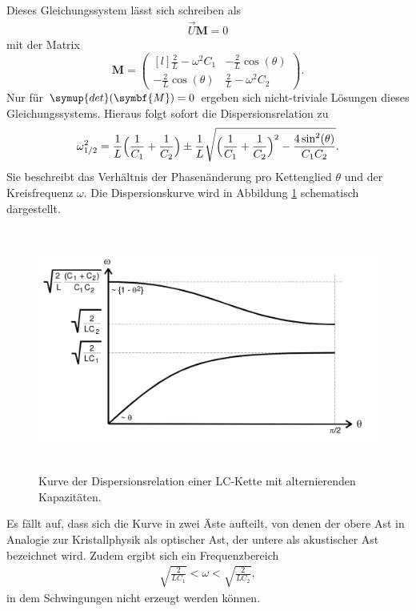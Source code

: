 Dieses Gleichungssystem lässt sich schreiben als
\begin{align*}
  \vec{U} \symbf{M} = 0
\end{align*}
mit der Matrix
\begin{equation}
  \symbf{M} =
  \begin{pmatrix*}[l]
    \frac{2}{L} - \omega^2 C_1 & -\frac{2}{L} \cos{(\theta)} \\
    -\frac{2}{L} \cos{(\theta)} & \frac{2}{L} - \omega^2 C_2
  \end{pmatrix*}.
\end{equation}
Nur für $\symup{det}(\symbf{M})=0$ ergeben sich nicht-triviale Lösungen dieses Gleichungssystems.
Hieraus folgt sofort die Dispersionsrelation zu
\begin{equation}
  \label{eqn:dispersion}
  \omega_{1/2}^2 = \frac{1}{L} \Bigl( \frac{1}{C_1} + \frac{1}{C_2} \Bigr) \pm \frac{1}{L} \sqrt{ \Bigl( \frac{1}{C_1} + \frac{1}{C_2} \Bigr)^2 - \frac{4 \sin^2 \! {\left(\theta \right)}}{C_1 C_2} }.
\end{equation}
Sie beschreibt das Verhältnis der Phasenänderung pro Kettenglied $\theta$ und der Kreisfrequenz $\omega$.
Die Dispersionskurve wird in Abbildung \ref{tfig:2} schematisch dargestellt.
\begin{figure}[H]
  \centering
  \includegraphics[height=8cm]{dispersionskurve.png}
  \caption{Kurve der Dispersionsrelation einer LC-Kette mit alternierenden Kapazitäten. \cite{sample}}
  \label{tfig:2}
\end{figure}
Es fällt auf, dass sich die Kurve in zwei Äste aufteilt, von denen der obere Ast in Analogie zur Kristallphysik als optischer Ast, der untere als akustischer Ast bezeichnet wird.
Zudem ergibt sich ein Frequenzbereich
\begin{align}
  \label{eqn:grenzfrequenzen}
  \sqrt{\frac{2}{LC_1}} < \omega < \sqrt{\frac{2}{LC_2}},
\end{align}
in dem Schwingungen nicht erzeugt werden können.
